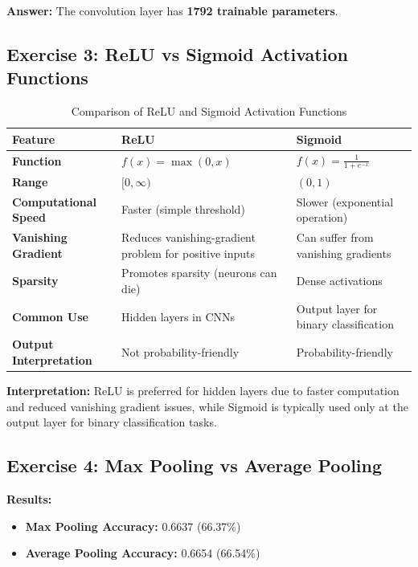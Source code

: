 \documentclass[11pt]{article}
\begin{document}
\textbf{Answer:} The convolution layer has \textbf{1792 trainable parameters}.

\subsection*{Exercise 3: ReLU vs Sigmoid Activation Functions}

\begin{table}[H]
\centering
\begin{tabular}{|p{3.5cm}|p{4.5cm}|p{4.5cm}|}
\hline
\textbf{Feature} & \textbf{ReLU} & \textbf{Sigmoid} \\
\hline
\textbf{Function} &
$f(x)=\max(0,x)$ &
$f(x)=\frac{1}{1+e^{-x}}$ \\
\hline
\textbf{Range} &
$[0,\infty)$ &
$(0,1)$ \\
\hline
\textbf{Computational Speed} &
Faster (simple threshold) &
Slower (exponential operation) \\
\hline
\textbf{Vanishing Gradient} &
Reduces vanishing-gradient problem for positive inputs &
Can suffer from vanishing gradients \\
\hline
\textbf{Sparsity} &
Promotes sparsity (neurons can die) &
Dense activations \\
\hline
\textbf{Common Use} &
Hidden layers in CNNs &
Output layer for binary classification \\
\hline
\textbf{Output Interpretation} &
Not probability-friendly &
Probability-friendly \\
\hline
\end{tabular}
\caption{Comparison of ReLU and Sigmoid Activation Functions}
\end{table}

\textbf{Interpretation:} ReLU is preferred for hidden layers due to faster computation and reduced vanishing gradient issues, while Sigmoid is typically used only at the output layer for binary classification tasks.

\subsection*{Exercise 4: Max Pooling vs Average Pooling}

\textbf{Results:}

\begin{itemize}
\item \textbf{Max Pooling Accuracy:} 0.6637 (66.37\%)
\item \textbf{Average Pooling Accuracy:} 0.6654 (66.54\%)
\end{itemize}
\end{document}
